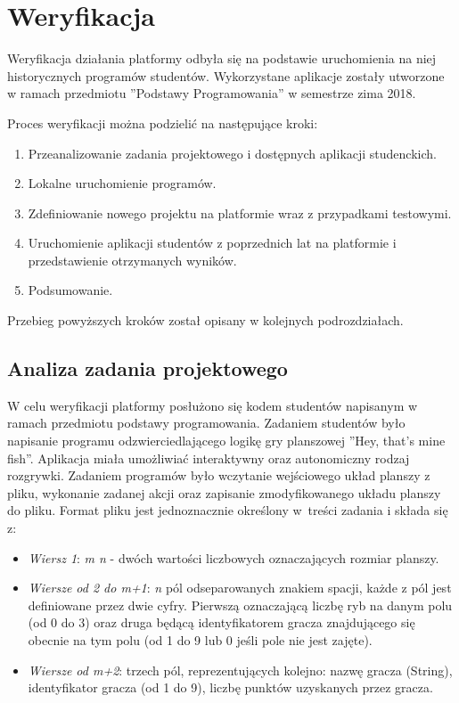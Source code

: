\chapter{Weryfikacja}
\label{chapter:verify}

Weryfikacja działania platformy odbyła się na podstawie uruchomienia na niej historycznych programów studentów.
Wykorzystane aplikacje zostały utworzone w ramach przedmiotu ”Podstawy Programowania” w semestrze zima 2018.

Proces weryfikacji można podzielić na następujące kroki:
\begin{enumerate}
    \item Przeanalizowanie zadania projektowego i dostępnych aplikacji studenckich.
    \item Lokalne uruchomienie programów.
    \item Zdefiniowanie nowego projektu na platformie wraz z przypadkami testowymi.
    \item Uruchomienie aplikacji studentów z poprzednich lat na platformie i przedstawienie otrzymanych wyników.
    \item Podsumowanie.
\end{enumerate}

Przebieg powyższych kroków został opisany w kolejnych podrozdziałach.


\section{Analiza zadania projektowego}
\label{analysis_students_projects}

W celu weryfikacji platformy posłużono się kodem studentów napisanym w ramach przedmiotu podstawy programowania.
Zadaniem studentów było napisanie programu odzwierciedlającego logikę gry planszowej ”Hey, that’s mine fish”.
Aplikacja miała umożliwiać interaktywny oraz autonomiczny rodzaj rozgrywki.
Zadaniem programów było wczytanie wejściowego układ planszy z pliku, wykonanie zadanej akcji oraz zapisanie zmodyfikowanego układu planszy do pliku.
Format pliku jest jednoznacznie określony w~treści zadania i składa się z:
\begin{itemize}
    \item \textit{Wiersz 1}: \textit{m n} - dwóch wartości liczbowych oznaczających rozmiar planszy.
    \item \textit{Wiersze od 2 do m+1}: \textit{n} pól odseparowanych znakiem spacji, każde z pól jest definiowane przez dwie cyfry.
    Pierwszą oznaczającą liczbę ryb na danym polu (od 0 do 3) oraz druga będącą identyfikatorem gracza znajdującego się obecnie na tym polu (od 1 do 9 lub 0 jeśli pole nie jest zajęte).
    \item \textit{Wiersze od m+2}: trzech pól, reprezentujących kolejno: nazwę gracza (String), identyfikator gracza (od 1 do 9), liczbę punktów uzyskanych przez gracza.
\end{itemize}

